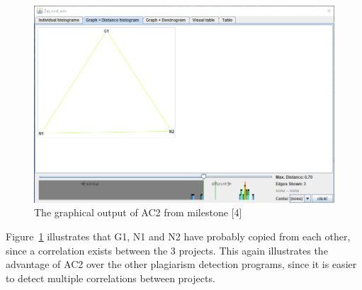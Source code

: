 \documentclass[a4paper, 11pt]{article}
\renewcommand{\\}{\vspace*{0.5\baselineskip} \newline}
\begin{document}
\begin{figure}[h]
	\centering
		\includegraphics[height=0.2\textheight]{figs/AC2/M4_1.png}
		\caption{The graphical output of AC2 from milestone [4]}
		\label{fig:AC2R2}
\end{figure}

Figure~\ref{fig:AC2R2} illustrates that G1, N1 and N2 have probably copied from each other, since a correlation exists between the 3 projects. This again illustrates the advantage of AC2 over the other plagiarism detection programs, since it is easier to detect multiple correlations between projects.
\end{document}

